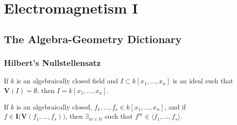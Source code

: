 \documentclass[crop=false,class=article,oneside]{standalone}
\begin{document}
    \ifx\ifgeoalg\undefined
        \section*{Electromagnetism I}
        \setcounter{section}{1}
    \fi
    \subsection{The Algebra-Geometry Dictionary}
    \subsubsection{Hilbert's Nullstellensatz}
    \begin{theorem}
    If $k$ is an algebraically closed field and $I \subset k[x_1,\hdots ,x_n]$ is an ideal such that $\mathbf{V}(I) = \emptyset$, then $I = k[x_1,\hdots ,x_n]$.
    \end{theorem}
    \begin{theorem}
    If $k$ is an algebraically closed, $f_{1},\hdots,f_{s}\in k[x_{1},\hdots,x_{n}]$, and if $f\in \textbf{I}\big(\mathbf{V}(f_1,\hdots, f_s)\big)$, then $\exists_{m\in\mathbb{N}}$ such that $f^m \in \langle f_1,\hdots, f_s \rangle$.
    \end{theorem}
\end{document}

